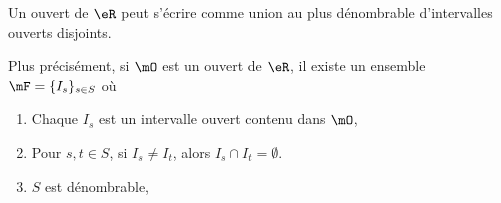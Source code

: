 \begin{proposition}         \label{PROPooTXMBooZaSKFF}
	Un ouvert de \( \eR\) peut s'écrire comme union au plus dénombrable d'intervalles ouverts disjoints.

	Plus précisément, si \( \mO\) est un ouvert de \( \eR\), il existe un ensemble \( \mF=\{ I_s \}_{s\in S}\) où
	\begin{enumerate}
		\item
		      Chaque \( I_s\) est un intervalle ouvert contenu dans \( \mO\),
		\item
		      Pour \( s,t\in S\), si \( I_s\neq I_t\), alors \( I_s\cap I_t=\emptyset\).
		\item
		      \( S\) est dénombrable,
	\end{enumerate}
\end{proposition}   

